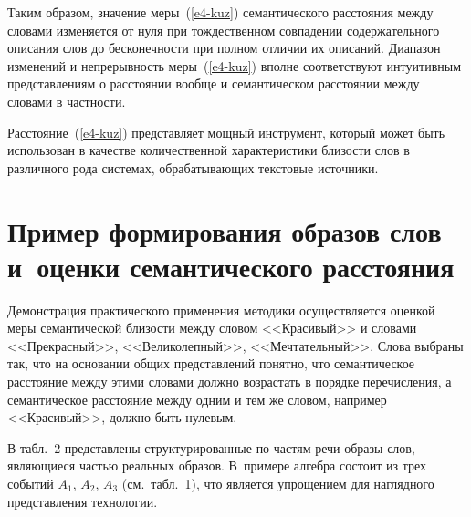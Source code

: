\begin{multicols}{2}
     Таким образом, значение меры~(\ref{e4-kuz}) семантического расстояния 
между словами изменяется от нуля при тождественном совпадении 
содержательного описания слов до бесконечности при полном отличии их 
описаний. Диапазон изменений и непрерывность меры~(\ref{e4-kuz}) вполне 
соответствуют интуитивным представлениям о расстоянии вообще и 
семантическом расстоянии между словами в частности. 
     
     Расстояние~(\ref{e4-kuz}) представляет мощный инструмент, который 
может быть использован в качестве количественной характеристики близости 
слов в различного рода системах, обрабатывающих текстовые источники. 
     

\section{Пример формирования образов слов и~оценки 
семантического расстояния}

\vspace*{2pt}

     Демонстрация практического применения мето\-ди\-ки осуществляется 
оценкой меры семантической близости между словом <<Красивый>> и 
словами <<Прекрасный>>, <<Великолепный>>, <<Мечтательный>>. Слова 
выбраны так, что на основании общих представлений понятно, что 
семантическое расстояние между этими словами должно возрастать в порядке 
перечисления, а семантическое расстояние между одним и тем же словом, 
например <<Красивый>>, должно быть нулевым.
     
     В табл.~2 представлены структурированные по частям речи образы слов, 
являющиеся частью реальных образов. В~примере алгебра состоит из трех 
событий $A_1$, $A_2$, $A_3$ (см.\ табл.~1), что является упрощением для 
наглядного представления технологии.
     
\begin{table*}\small
\begin{center}
\vspace*{2ex}


\end{center}
\end{table*}
\end{multicols}
